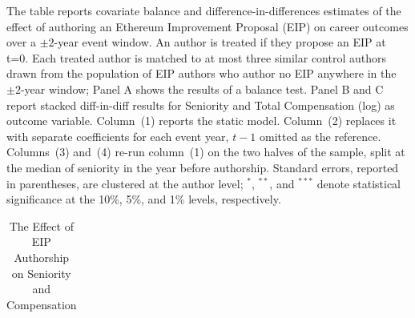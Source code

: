 
\begin{center}
\begin{table}
 \caption{The Effect of EIP Authorship on Seniority and Compensation} \label{tab:did_main}
     \begin{small}
    \begin{minipage}{\textwidth}
      The table reports covariate balance and difference-in-differences estimates of the effect of authoring an Ethereum Improvement Proposal (EIP) on career outcomes over a
$\pm2$-year event window. An author is treated if they propose an EIP at t=0. Each treated author is matched to at most three similar control
authors drawn from the population of EIP authors who author no EIP anywhere in the $\pm2$-year window; Panel A shows the results of a balance test. Panel B and C report stacked diff-in-diff results for Seniority and Total Compensation (log) as outcome variable. Column~(1) reports the static model. Column~(2) replaces it with separate coefficients for each event year, $t-1$ omitted as the reference. Columns~(3) and~(4)
re-run column~(1) on the two halves of the sample, split at the median of seniority in the year before authorship. Standard errors, reported in parentheses, are clustered at the author level;  $^{*}$, $^{**}$, and $^{***}$ denote statistical significance at the 10\%, 5\%, and 1\% levels, respectively.
  \end{minipage}
         \end{small}
\begin{tabular}{lcccccc}
\\


\end{tabular}
\end{table}
\end{center}
